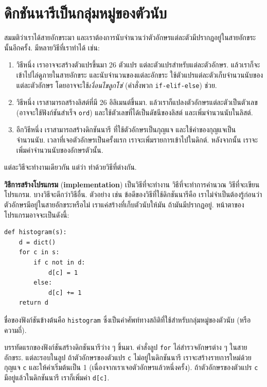 \section{ดิกชันนารีเป็นกลุ่มหมู่ของตัวนับ}
\label{histogram}

สมมติว่าเราได้สายอักขระมา และเราต้องการนับจำนวนว่าตัวอักษรแต่ละตัวมีปรากฎอยู่ในสายอักขระนั้นอีกครั้ง.
มีหลายวิธีที่เราทำได้ เช่น:

\begin{enumerate}

\item วิธีหนึ่ง เราอาจจะสร้างตัวแปรขึ้นมา 26 ตัวแปร แต่ละตัวแปรสำหรับแต่ละตัวอักษร.
แล้วเราก็จะเข้าไปไล่ดูภายในสายอักขระ
และนับจำนวนของแต่ละอักขระ 
ใช้ตัวแปรแต่ละตัวเก็บจำนวนนับของแต่ละตัวอักษร
โดยอาจจะใช้\textit{เงื่อนไขลูกโซ่} (คำสั่งพวก \texttt{if-elif-else}) ช่วย.

\item วิธีหนึ่ง เราสามารถสร้างลิสต์ที่มี 26 อิลิเมนต์ขึ้นมา.
แล้วเราก็แปลงตัวอักษรแต่ละตัวเป็นตัวเลข (อาจจะใช้ฟังก์ชันสำเร็จ \texttt{ord}) และใช้ตัวเลขที่ได้เป็นดัชนีของลิสต์ 
และเพิ่มจำนวนนับในลิสต์.

\item อีกวิธีหนึ่ง เราสามารถสร้างดิกชันนารี
ที่ใช้ตัวอักษรเป็นกุญแจ
และใช้ค่าของกุญแจเป็นจำนวนนับ.
เวลาที่เจอตัวอักษรเป็นครั้งแรก เราจะเพิ่มรายการเข้าไปในดิกต์.
หลังจากนั้น เราจะเพิ่มค่าจำนวนนับของอักษรตัวนั้น.

\end{enumerate}

แต่ละวิธีจะทำงานเดียวกัน
แต่ว่า ทำด้วยวิธีที่ต่างกัน.

\textbf{วิธีการสร้างโปรแกรม} (\textbf{implementation}) 
เป็นวิธีที่จะทำงาน วิธีที่จะทำการคำนวณ วิธีที่จะเขียนโปรแกรม.
บางวิธีจะดีกว่าวิธีอื่น.
ตัวอย่าง เช่น 
ข้อดีของวิธีที่ใช้ดิกชันนารีคือ
เราไม่จำเป็นต้องรู้ก่อนว่า ตัวอักษรมีอยู่ในสายอักขระหรือไม่
เราแค่สร้างที่เก็บตัวนับให้มัน ถ้ามันมีปรากฏอยู่.
หน้าตาของโปรแกรมอาจจะเป็นดังนี้:

\begin{verbatim}
def histogram(s):
    d = dict()
    for c in s:
        if c not in d:
            d[c] = 1
        else:
            d[c] += 1
    return d
\end{verbatim}
%
ชื่อของฟังก์ชันข้างต้นคือ \texttt{histogram}
ซึ่งเป็นคำศัพท์ทางสถิติที่ใช้สำหรับกลุ่มหมู่ของตัวนับ (หรือ ความถี่).

บรรทัดแรกของฟังก์ชันสร้างดิกชันนารีว่าง ๆ ขึ้นมา.
คำสั่งลูป \texttt{for} ไล่สำรวจอักษรต่าง ๆ ในสายอักขระ.
แต่ละรอบในลูป ถ้าตัวอักษรของตัวแปร \texttt{c} ไม่อยู่ในดิกชันนารี
เราจะสร้างรายการใหม่ด้วยกุญแจ \texttt{c} และให้ค่าเริ่มต้นเป็น 1 (เนื่องจากเราเจอตัวอักษรแล้วหนึ่งครั้ง).
ถ้าตัวอักษรของตัวแปร \texttt{c} มีอยู่แล้วในดิกชันนารี เราก็เพิ่มค่า \texttt{d[c]}.

